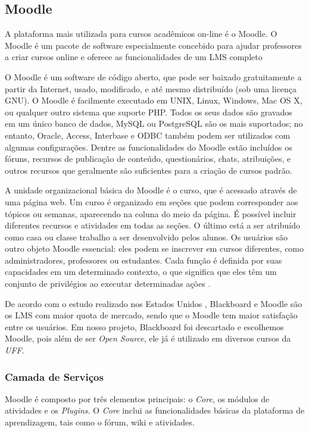 \subsection{Moodle}

A plataforma mais utilizada para cursos acadêmicos on-line é o Moodle. O Moodle é um pacote de software especialmente concebido para ajudar professores a criar cursos online e oferece as funcionalidades de um LMS completo \cite{article:desnica-letic}

 O Moodle é um software de código aberto, que pode ser baixado gratuitamente a partir da Internet, usado, modificado, e até mesmo distribuído (sob uma licença GNU). O Moodle é facilmente executado em UNIX, Linux, Windows, Mac OS X, ou qualquer outro sistema que suporte PHP. Todos os seus dados são gravados em um único banco de dados, MySQL ou PostgreSQL são os mais suportados; no entanto, Oracle, Access, Interbase e ODBC  também podem ser utilizados com algumas configurações.
Dentre as funcionalidades do Moodle estão incluídos os fóruns, recursos de publicação de conteúdo, questionários, chats, atribuições, e outros recursos que geralmente são suficientes para a criação de cursos padrão. 

A unidade organizacional básica do Moodle é o curso, que é acessado através de uma página web. Um curso é organizado em seções que podem corresponder aos tópicos ou semanas, aparecendo na coluna do meio da página. É possível incluir diferentes recursos e atividades em todas as seções. O último está a ser atribuído como casa ou classe trabalho a ser desenvolvido pelos alunos. Os usuários são outro objeto Moodle essencial: eles podem se inscrever em cursos diferentes, como administradores, professores ou estudantes. Cada função é definida por suas capacidades em um determinado contexto, o que significa que eles têm um conjunto de privilégios ao executar determinadas ações \cite{article:isljamovic-petrovic}.

De acordo com o estudo realizado nos Estados Unidos \cite{article:wexler}, Blackboard e Moodle são os LMS com maior quota de mercado, sendo que o Moodle tem maior satisfação entre os usuários. Em nosso projeto, Blackboard foi descartado e escolhemos Moodle, pois além de ser \textit{Open Source}, ele já é utilizado em diversos cursos da \textit{UFF}.

\subsubsection{Camada de Serviços}
Moodle é composto por três elementos principais: o \textit{Core}, os módulos de atividades e os \textit{Plugins}. O \textit{Core} inclui as funcionalidades básicas da plataforma de aprendizagem, tais como o fórum, wiki e atividades.

